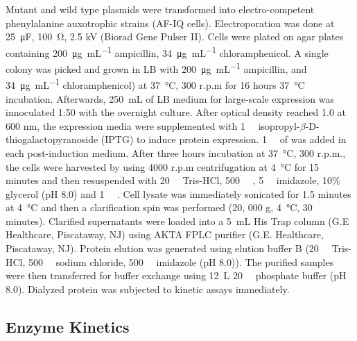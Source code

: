 \begin{refsection}
Mutant and wild type plasmids were transformed into electro-competent  phenylalanine auxotrophic strains (AF-IQ cells). Electroporation was done
at \SI{25}{\micro\farad}, \SI{100}{\ohm}, 2.5 kV (Biorad Gene Pulser II).
Cells were plated on agar plates containing \SI{200}{\ug\per\mL} ampicillin,
\SI{34}{\ug\per\mL} chloramphenicol. A single colony was picked and grown in LB
with \SI{200}{\ug\per\mL} ampicillin, and \SI{34}{\ug\per\mL} chloramphenicol)
at \SI{37}{\celsius}, 300 r.p.m for 16 hours \SI{37}{\celsius} incubation.
Afterwards, \SI{250}{\mL} of LB medium for large-scale expression was
innoculated 1:50 with the overnight culture.  After optical density reached 1.0
at 600 nm, the expression media were supplemented with \SI{1}{\milli\Molar}
isopropyl-$\beta$-D-thiogalactopyranoside (IPTG) to induce protein expression.
\SI{1}{\milli\Molar} of  was added in each post-induction medium.
After three hours incubation at \SI{37}{\celsius}, 300 r.p.m., the cells were
harvested by using 4000 r.p.m centrifugation at \SI{4}{\celsius} for 15 minutes
and then resuspended with \SI{20}{\milli\Molar} Tris-HCl,
\SI{500}{\milli\Molar} , \SI{5}{\milli\Molar} imidazole, 10\% glycerol
(pH 8.0) and \SI{1}{\micro\Molar} . Cell lysate was immediately
sonicated for 1.5 minutes at \SI{4}{\celsius} and then a clarification spin was
performed (20, 000 g, \SI{4}{\celsius}, 30 minutes).  Clarified supernatants
were loaded into a \SI{5}{\mL} His Trap column (G.E Healthcare, Piscataway, NJ)
using AKTA FPLC purifier (G.E.  Healthcare, Piscataway, NJ).  Protein elution
was generated using elution buffer B (\SI{20}{\milli\Molar} Tris-HCl,
\SI{500}{\milli\Molar} sodium chloride, \SI{500}{\milli\Molar} imidazole (pH
8.0)).  The purified samples were then transferred for buffer exchange using
\SI{12}{\L} \SI{20}{\milli\Molar} phosphate buffer (pH 8.0).  Dialyzed protein
was subjected to kinetic assays immediately.

\subsection{Enzyme Kinetics}


\end{refsection}
